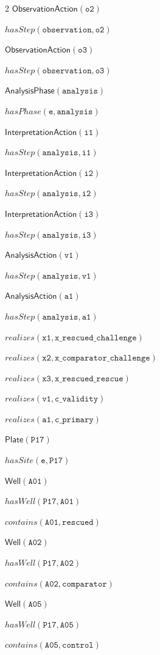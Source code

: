 \documentclass[10pt,a4paper]{article}
\begin{document}
{\begin{multicols}{2}
$\mathsf{ObservationAction}(\mathtt{o2})$\par
$\mathit{hasStep}(\mathtt{observation}, \mathtt{o2})$\par
$\mathsf{ObservationAction}(\mathtt{o3})$\par
$\mathit{hasStep}(\mathtt{observation}, \mathtt{o3})$\par
$\mathsf{AnalysisPhase}(\mathtt{analysis})$\par
$\mathit{hasPhase}(\mathtt{e}, \mathtt{analysis})$\par
$\mathsf{InterpretationAction}(\mathtt{i1})$\par
$\mathit{hasStep}(\mathtt{analysis}, \mathtt{i1})$\par
$\mathsf{InterpretationAction}(\mathtt{i2})$\par
$\mathit{hasStep}(\mathtt{analysis}, \mathtt{i2})$\par
$\mathsf{InterpretationAction}(\mathtt{i3})$\par
$\mathit{hasStep}(\mathtt{analysis}, \mathtt{i3})$\par
$\mathsf{AnalysisAction}(\mathtt{v1})$\par
$\mathit{hasStep}(\mathtt{analysis}, \mathtt{v1})$\par
$\mathsf{AnalysisAction}(\mathtt{a1})$\par
$\mathit{hasStep}(\mathtt{analysis}, \mathtt{a1})$\par
$\mathit{realizes}(\mathtt{x1}, \mathtt{x\_rescued\_challenge})$\par
$\mathit{realizes}(\mathtt{x2}, \mathtt{x\_comparator\_challenge})$\par
$\mathit{realizes}(\mathtt{x3}, \mathtt{x\_rescued\_rescue})$\par
$\mathit{realizes}(\mathtt{v1}, \mathtt{c\_validity})$\par
$\mathit{realizes}(\mathtt{a1}, \mathtt{c\_primary})$\par
$\mathsf{Plate}(\mathtt{P17})$\par
$\mathit{hasSite}(\mathtt{e}, \mathtt{P17})$\par
$\mathsf{Well}(\mathtt{A01})$\par
$\mathit{hasWell}(\mathtt{P17}, \mathtt{A01})$\par
$\mathit{contains}(\mathtt{A01}, \mathtt{rescued})$\par
$\mathsf{Well}(\mathtt{A02})$\par
$\mathit{hasWell}(\mathtt{P17}, \mathtt{A02})$\par
$\mathit{contains}(\mathtt{A02}, \mathtt{comparator})$\par
$\mathsf{Well}(\mathtt{A05})$\par
$\mathit{hasWell}(\mathtt{P17}, \mathtt{A05})$\par
$\mathit{contains}(\mathtt{A05}, \mathtt{control})$\par
\end{multicols}}
\end{document}
